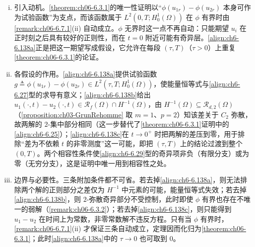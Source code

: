 \documentclass[../../main.tex]{subfiles}%
\begin{document}
\begin{remark}\label{remark:ch06-无界唯一动机}
\begin{enumerate}[(i)]
\item 引入动机。\cref{theorem:ch06-6.3.1}的唯一性证明以“$\phi(u_{1r})-\phi(u_{2r})$ 本身可作为试验函数”为支点，而该函数属于 $L^2(0,T;H^1_0(\Omega))$ 在 $\phi$ 有界时由\cref{remark:ch06-6.7.1}(ii) 自动成立。$\phi$ 无界时这一点不再自动：只能期望 $u_i$ 在正时刻之后具有较好的正则性，而在 $t=0$ 附近可能有奇异层。\eqref{align:ch6-6.138a}正是把这一期望写成假设，它允许在每段 $(\tau,T)$（$\tau>0$）上重复\cref{theorem:ch06-6.3.1}的论证。

\item 各假设的作用。\eqref{align:ch6-6.138a}提供试验函数 $g\triangleq\phi(u_{1r})-\phi(u_{2r})\in L^2(\tau,T;H^1_0(\Omega))$，使能量恒等式与\eqref{align:ch6-6.27}型的求导有意义；\eqref{align:ch6-6.138b}给出 $u_1(\cdot,t)-u_2(\cdot,t)\in\mathscr{R}_f(\Omega)\cap H^{-1}(\Omega)$，由 $H^{-1}(\Omega)\subseteq\mathscr{R}_{d,2}(\Omega)$（\cref{proposition:ch03-GrunRehomme} 取 $m=1$、$p=2$）知该差关于 $C_2$ 弥散，故两解的 $2$-集中部分相同（这一步替代了\cref{theorem:ch06-6.3.1}证明中的\eqref{align:ch6-6.25}）；\eqref{align:ch6-6.138c}在 $t\to0^+$ 时把两解的差压到零，用于排除“差为不依赖 $t$ 的非零测度”这一可能，即把 $(\tau,T)$ 上的结论过渡到整个 $(0,T)$。两个相容性条件使\eqref{align:ch6-6.29}型的奇异项非负（有限分支）或为零（无穷分支），这是证明中唯一用到相容性之处。

\item 边界与必要性。三条附加条件都不可省。若去掉\eqref{align:ch6-6.138a}，则无法排除两个解的正则部分之差仅为 $H^{-1}$ 中元素的可能，能量恒等式失效；若去掉\eqref{align:ch6-6.138b}，则 $2$-弥散奇异部分不受控制，此时即使 $\phi$ 有界也存在不唯一的弱解（\cref{remark:ch06-6.3.2}）；若去掉\eqref{align:ch6-6.138c}，则只能得到 $u_1-u_2$ 在时间上为常数，非零常数解不违反方程。只有当 $\phi$ 有界时，\cref{remark:ch06-6.7.1}(ii) 才保证三条自动成立，定理因而化归为\cref{theorem:ch06-6.3.1}；此时\eqref{align:ch6-6.138a}中的 $\tau\to0$ 也可取到 $0$。
\end{enumerate}
\end{remark}
\end{document}

